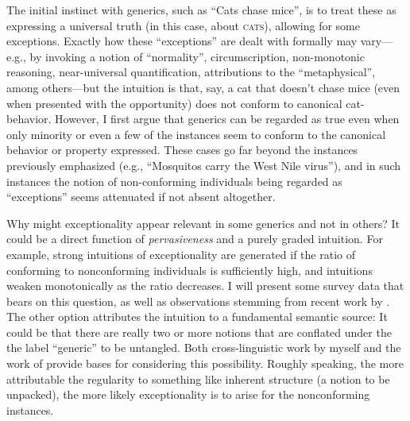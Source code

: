 \documentclass[10pt,letterpaper]{article}
\begin{document}
The initial instinct with generics, such as ``Cats chase mice'', is to treat these as expressing a universal truth (in this case, about \textsc{cats}), allowing for some exceptions.
 Exactly how these ``exceptions'' are dealt with formally may vary---e.g., by invoking a notion of ``normality'', %
 circumscription, %
 non-monotonic reasoning, %
 near-universal quantification, %
 attributions to the ``metaphysical'', %
 among others---but the intuition is that, say, a cat that doesn't chase mice (even when presented with the opportunity) does not conform to canonical cat-behavior.  
However, I first argue that generics can be regarded as true even when only minority or even a few of the instances seem to conform to the canonical behavior or property expressed.  
These cases go far beyond the instances previously emphasized (e.g., ``Mosquitos carry the West Nile virus''), and in such instances the notion of non-conforming individuals being regarded as ``exceptions'' seems attenuated if not absent altogether.

Why might exceptionality appear relevant in some generics and not in others? 
It could be a direct function of \emph{pervasiveness} and a purely graded intuition.
For example, strong intuitions of exceptionality are generated if the ratio of conforming to nonconforming individuals is sufficiently high, and intuitions weaken monotonically as the ratio decreases.
I will present some survey data that bears on this question, as well as observations stemming from recent work by . 
The other option attributes the intuition to a fundamental semantic source: It could be that there are really two or more notions that are conflated under the the label ``generic'' to be untangled. 
Both cross-linguistic work by myself and the work of  provide bases for considering this possibility.  
Roughly speaking, the more attributable the regularity to something like inherent structure (a notion to be unpacked), the more likely exceptionality is to arise for the nonconforming instances.

\nocite{shepard1987}



\setlength{\bibleftmargin}{.125in}
\setlength{\bibindent}{-\bibleftmargin}


\end{document}
